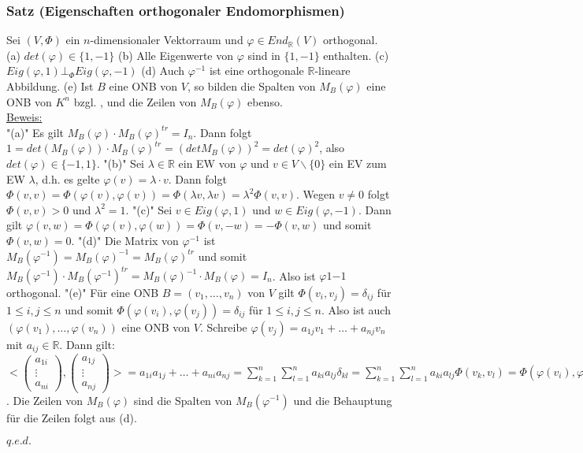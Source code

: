 \documentclass[a4paper]{article}
\newcommand{\ul}{\underline}
\renewcommand{\proof}{\ul{Beweis:}\\}
\renewcommand{\qed}{\begin{flushright}
\ul{\(q.e.d.\)}
\end{flushright}}
\let\phi\varphi
\begin{document}
\subsubsection{Satz (Eigenschaften orthogonaler Endomorphismen)}
Sei \((V,\Phi)\) ein \(n\)-dimensionaler Vektorraum und \(\phi\in End_\mathbb{R}(V)\) orthogonal.\\
(a) \(det(\phi)\in \{1,-1\}\)
(b) Alle Eigenwerte von \(\phi\) sind in \(\{1,-1\}\) enthalten.
(c) \(Eig(\phi,1)\bot_\Phi Eig(\phi,-1)\)
(d) Auch \(\phi^{-1}\) ist eine orthogonale \(\mathbb{R}\)-lineare Abbildung.
(e) Ist \(B\) eine ONB von \(V\), so bilden die Spalten von \(M_B(\phi)\) eine ONB von \(K^n\) bzgl. \(<,>\), und die Zeilen von \(M_B(\phi)\) ebenso.\\
\proof
"(a)" Es gilt \(M_B(\phi)\cdot M_B(\phi)^{tr}=I_n\). Dann folgt \(1=det(M_B(\phi))\cdot M_B(\phi)^{tr}=(det M_B(\phi))^2=det(\phi)^2\), also \(det(\phi)\in\{-1,1\}\).
"(b)" Sei \(\lambda\in \mathbb{R}\) ein EW von \(\phi\) und \(v\in V\backslash\{0\}\) ein EV zum EW \(\lambda\), d.h. es gelte \(\phi(v)=\lambda\cdot v\). Dann folgt \(\Phi(v,v)=\Phi(\phi(v),\phi(v))=\Phi(\lambda v, \lambda v)=\lambda^2\Phi(v,v)\). Wegen \(v\neq 0\) folgt \(\Phi(v,v)>0\) und \(\lambda^2=1\).
"(c)" Sei \(v\in Eig(\phi,1)\) und \(w\in Eig(\phi,-1)\). Dann gilt \(\phi(v,w)=\Phi(\phi(v),\phi(w))=\Phi(v,-w)=-\Phi(v,w)\) und somit \(\Phi(v,w)=0\).
"(d)" Die Matrix von \(\phi^{-1}\) ist \(M_B(\phi^{-1})=M_B(\phi)^{-1}=M_B(\phi)^{tr}\) und somit \(M_B(\phi^{-1})\cdot M_B(\phi^{-1})^{tr}=M_B(\phi)^{-1}\cdot M_B(\phi)=I_n\). Also ist \(\phi1{-1}\) orthogonal.
"(e)" Für eine ONB \(B=(v_1,\dots,v_n)\) von \(V\) gilt \(\Phi(v_i,v_j)=\delta_{ij}\) für \(1\leq i,j\leq n\) und somit \(\Phi(\phi(v_i), \phi(v_j))=\delta_{ij}\) für \(1\leq i,j\leq n\). Also ist auch \((\phi(v_1),\dots,\phi(v_n))\) eine ONB von \(V\). Schreibe \(\phi(v_j)=a_{1j}v_1+\dots+a_{nj}v_n\) mit \(a_{ij}\in\mathbb{R}\). Dann gilt: \(<\begin{pmatrix}
a_{1i}\\
\vdots\\
a_{ni}
\end{pmatrix},\begin{pmatrix}
a_{1j}\\
\vdots\\
a_{nj}
\end{pmatrix}>=a_{1i}a_{1j}+\dots+a_{ni}a_{nj}=\sum_{k=1}^n\sum_{l=1}^na_{ki}a_{lj}\delta_{kl}=\sum_{k=1}^n\sum_{l=1}^na_{ki}a_{lj}\Phi(v_k,v_l)=\Phi(\phi(v_i),\phi(v_j))=\delta_{ij}\). Die Zeilen von \(M_B(\phi)\) sind die Spalten von \(M_B(\phi^{-1})\) und die Behauptung für die Zeilen folgt aus (d).
\qed
\end{document}
